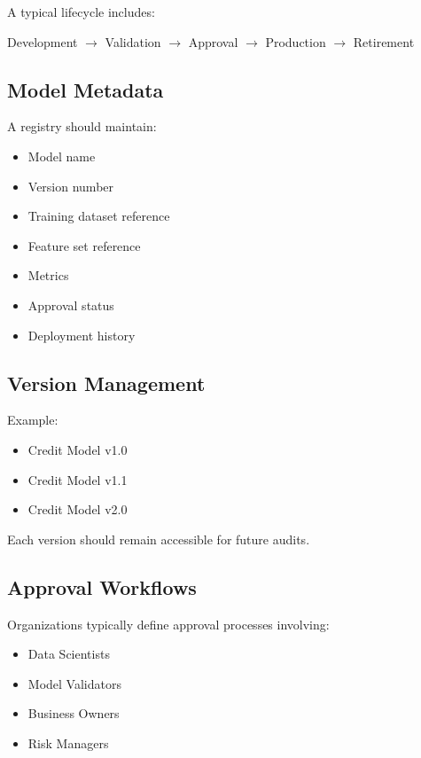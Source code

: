 A typical lifecycle includes:

\begin{center}
Development
$\rightarrow$
Validation
$\rightarrow$
Approval
$\rightarrow$
Production
$\rightarrow$
Retirement
\end{center}

\subsection{Model Metadata}

A registry should maintain:

\begin{itemize}
    \item Model name
    \item Version number
    \item Training dataset reference
    \item Feature set reference
    \item Metrics
    \item Approval status
    \item Deployment history
\end{itemize}

\subsection{Version Management}

Example:

\begin{itemize}
    \item Credit Model v1.0
    \item Credit Model v1.1
    \item Credit Model v2.0
\end{itemize}

Each version should remain accessible for future audits.

\subsection{Approval Workflows}

Organizations typically define approval processes involving:

\begin{itemize}
    \item Data Scientists
    \item Model Validators
    \item Business Owners
    \item Risk Managers
\end{itemize}

